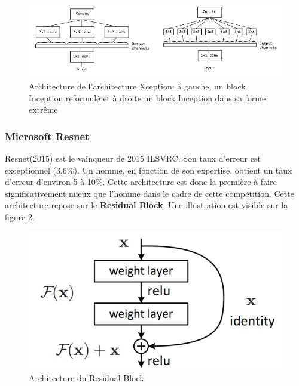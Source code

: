 \begin{figure}
    \centering
    \includegraphics[scale=0.4]{./tex/convolution-network/classifier/xceptionv2.png}
    \caption{Architecture de l'architecture Xception: à gauche, un block Inception reformulé et à droite un block Inception dans sa forme extrême}
    \label{xception2}
\end{figure}

\subsubsection{Microsoft Resnet}
\label{resnet}

Resnet\cite{resnet}(2015) est le vainqueur de 2015 ILSVRC. Son taux d'erreur est exceptionnel (3,6\%). Un homme, en fonction de son expertise, obtient un taux d'erreur d'environ 5 à 10\%. Cette architecture est donc la première à faire significativement mieux que l'homme dans le cadre de cette compétition. Cette architecture repose sur le \textbf{Residual Block}. Une illustration est visible sur la figure \ref{residual}.\\

\begin{figure}
    \centering
    \includegraphics[scale=0.3]{./tex/convolution-network/classifier/residual.png}
    \caption{Architecture du Residual Block}
    \label{residual}
\end{figure}

